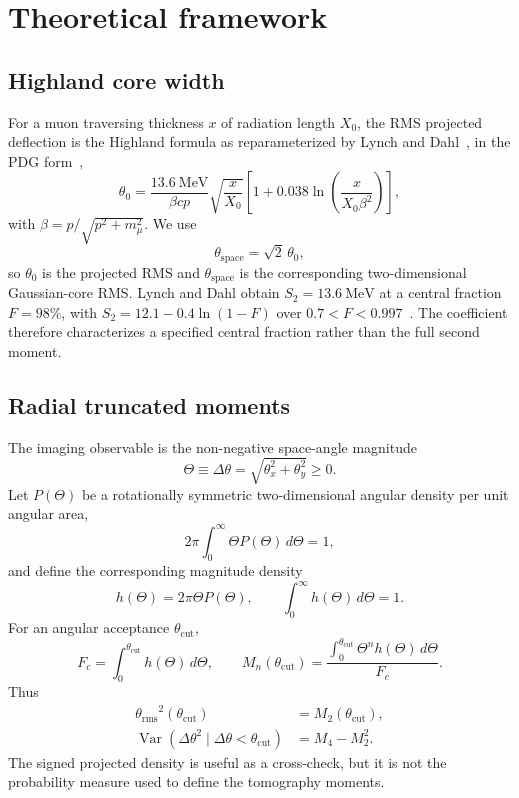 \documentclass[aps,pra,reprint,longbibliography,floatfix]{revtex4-2}
\newcommand{\thetazero}{\ensuremath{\theta_0}}
\newcommand{\thetaspace}{\ensuremath{\theta_{\mathrm{space}}}}
\newcommand{\thetarms}{\ensuremath{\theta_{\mathrm{rms}}}}
\newcommand{\thetacut}{\ensuremath{\theta_{\mathrm{cut}}}}
\newcommand{\dtheta}{\ensuremath{\Delta\theta}}
\newcommand{\XZero}{\ensuremath{X_0}}
\begin{document}
\section{Theoretical framework}\label{sec:framework}

\subsection{Highland core width}
For a muon traversing thickness $x$ of radiation length $\XZero$, the RMS projected deflection is the Highland formula as reparameterized by Lynch and Dahl~\cite{highland1975,lynch1991}, in the PDG form~\cite{pdg2026},
\begin{equation}\label{eq:highland}
\thetazero = \frac{13.6~\mathrm{MeV}}{\beta c p}\sqrt{\frac{x}{\XZero}}
\left[1+0.038\ln\!\left(\frac{x}{\XZero\beta^2}\right)\right],
\end{equation}
with $\beta=p/\sqrt{p^2+m_\mu^2}$.  We use
\begin{equation}
\thetaspace=\sqrt{2}\,\thetazero,
\end{equation}
so $\thetazero$ is the projected RMS and $\thetaspace$ is the corresponding two-dimensional Gaussian-core RMS.  Lynch and Dahl obtain $S_2=13.6~\mathrm{MeV}$ at a central fraction $F=98\%$, with $S_2=12.1-0.4\ln(1-F)$ over $0.7<F<0.997$~\cite{lynch1991}.  The coefficient therefore characterizes a specified central fraction rather than the full second moment.

\subsection{Radial truncated moments}\label{sec:moments}
The imaging observable is the non-negative space-angle magnitude
\begin{equation}\label{eq:Theta_def}
\Theta\equiv\dtheta=\sqrt{\theta_x^2+\theta_y^2}\ge0.
\end{equation}
Let $P(\Theta)$ be a rotationally symmetric two-dimensional angular density per unit angular area,
\begin{equation}\label{eq:Pnorm}
2\pi\int_0^\infty \Theta P(\Theta)\,d\Theta=1,
\end{equation}
and define the corresponding magnitude density
\begin{equation}\label{eq:hdef}
h(\Theta)=2\pi\Theta P(\Theta),\qquad \int_0^\infty h(\Theta)\,d\Theta=1.
\end{equation}
For an angular acceptance $\thetacut$,
\begin{equation}\label{eq:Fc}
F_c=\int_0^{\thetacut}h(\Theta)\,d\Theta,
\qquad
M_n(\thetacut)=\frac{\int_0^{\thetacut}\Theta^n h(\Theta)\,d\Theta}{F_c}.
\end{equation}
Thus
\begin{align}
\thetarms^2(\thetacut)&=M_2(\thetacut),\label{eq:rms_var_def}\\
\operatorname{Var}(\dtheta^2\mid\dtheta<\thetacut)&=M_4-M_2^2.
\end{align}
The signed projected density is useful as a cross-check, but it is not the probability measure used to define the tomography moments.
\end{document}
